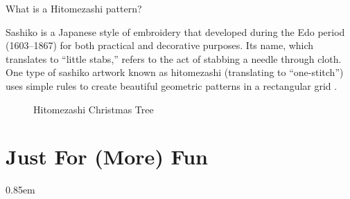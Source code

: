 \documentclass{article}
\theoremstyle{definition}
\begin{document}
\bigskip
\noindent
What is a Hitomezashi pattern?

\bigskip
\noindent
Sashiko is a Japanese style of embroidery that developed during the Edo 
period (1603–1867) for both practical and decorative purposes. Its name, 
which translates to “little stabs,” refers to the act of stabbing a 
needle through cloth. One type of sashiko artwork known as hitomezashi 
(translating to “one-stitch”) uses simple rules to create beautiful 
geometric patterns in a rectangular grid \cite{hitomezashi_stich_pattern,
hitomezashi_pattern,mathematical_specification_of_hitomezashi_designs}.


\bigskip
\begin{figure} [H]
  \caption{Hitomezashi Christmas Tree}
  \label{figure:hitomezashi_christmas_tree}
\end{figure}


\smallskip
\section{Just For (More) Fun}

\setlength {\fboxsep} {0.85em}											%
\setlength {\fboxrule}{0.75pt}											%
\end{document}
